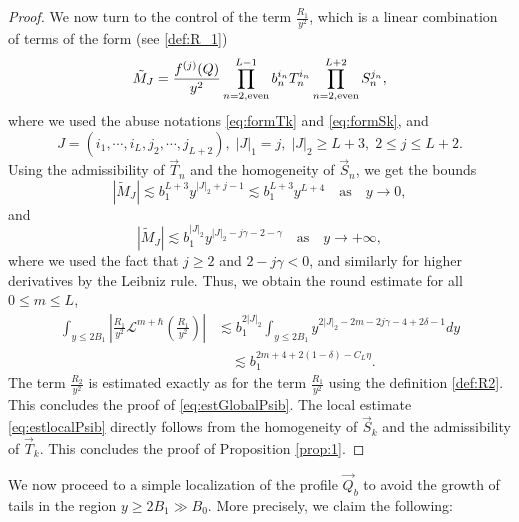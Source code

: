 \documentclass[11pt]{aims}
\theoremstyle{definition}
\numberwithin{equation}{section}
\begin{document}
\begin{proof}
We now turn to the control of the term $\frac{R_1}{y^2}$, which is a linear combination of terms of the form (see \eqref{def:R_1})
$$\tilde{M}_J = \frac{f^{(j)}(Q)}{y^2}\prod_{n = 2, \textup{even} }^{L-1}b_n^{i_n}T_n^{i_n}\prod_{n = 2, \textup{even}}^{L+2}S_{n}^{j_n},$$
where we used the abuse notations \eqref{eq:formTk} and \eqref{eq:formSk}, and
$$J = (i_1, \cdots, i_L, j_2, \cdots, j_{L+2}), \; |J|_1 = j, \; |J|_2 \geq L+3, \; 2 \leq j \leq L+2.$$
Using the admissibility of $\vec T_n$ and the homogeneity of $\vec S_n$, we get the bounds
$$|\tilde{M}_J| \lesssim b_1^{L + 3}y^{|J|_2 + j - 1} \lesssim b_1^{L+3}y^{L + 4} \quad \text{as} \quad y \to 0,$$
and 
$$|\tilde{M}_J| \lesssim b_1^{|J|_2}y^{|J|_2 - j\gamma - 2 - \gamma}  \quad \text{as}\quad y \to +\infty,$$
where we used the fact that $j \geq 2$ and $2 - j\gamma < 0$, and similarly for higher derivatives by the Leibniz rule. Thus, we obtain the round estimate for all $0 \leq m \leq L$,
\begin{align*}
\int_{y \leq 2B_1}\left|\frac{R_1}{y^2} {\mathscr{L}}^{m + \hbar}\left(\frac{R_1}{y^2}\right)\right| &\lesssim b_1^{2|J|_2}\int_{y \leq 2B_1}y^{2|J|_2 - 2m - 2j \gamma - 4 + 2\delta - 1} dy\\
&\quad\lesssim b_1^{2m + 4 + 2(1 - \delta) - C_L\eta}.
\end{align*}
The term $\frac{R_2}{y^2}$ is estimated exactly as for the term $\frac{R_1}{y^2}$ using the definition \eqref{def:R2}. This concludes the proof of \eqref{eq:estGlobalPsib}. The local estimate \eqref{eq:estlocalPsib} directly follows from the homogeneity of $\vec S_k$ and the admissibility of $\vec T_k$. This concludes the proof of Proposition \ref{prop:1}.
\end{proof}

\bigskip

We now proceed to a simple localization of the profile $\vec Q_b$ to avoid the growth of tails in the region $y \geq 2B_1 \gg B_0$. More precisely, we claim the following:
\end{document}
